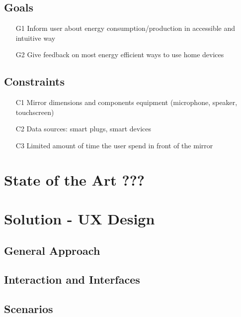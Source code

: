 \documentclass{article}
\begin{document}
    \subsection{Goals}
        \begin{itemize}
            \item[G1] Inform user about energy consumption/production in accessible and intuitive way
            \item[G2] Give feedback on most energy efficient ways to use home devices
        \end{itemize}
    \subsection{Constraints}
        \begin{itemize}
            \item[C1] Mirror dimensions and components equipment (microphone, speaker, touchscreen)
            \item[C2] Data sources: smart plugs, smart devices
            \item[C3] Limited amount of time the user spend in front of the mirror
        \end{itemize}
\newpage   

\section{State of the Art ???}
\newpage   
   
\section{Solution - UX Design}
    \subsection{General Approach}
    \subsection{Interaction and Interfaces}
    \subsection{Scenarios}


\newpage  
\end{document}

